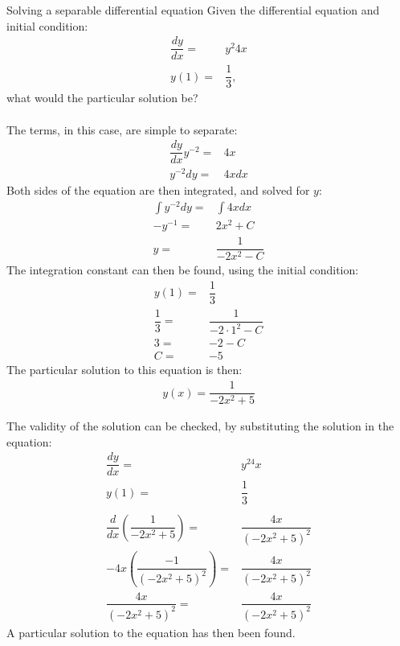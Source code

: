 \begin{example}{Solving a separable differential equation}{}
Given the differential equation and initial condition:
\begin{align*}
	\dfrac{dy}{dx} =& y^2 4x \\
	y(1) =& \dfrac{1}{3},
\end{align*}
what would the particular solution be?
\\ \\
The terms, in this case, are simple to separate: 
\begin{align*}
	\dfrac{dy}{dx} y^{-2} =& 4x \\
	y^{-2} dy =& 4x dx 
\end{align*}
Both sides of the equation are then integrated, and solved for $y$:
\begin{align*}
	\int{y^{-2} dy} =& \int{4x dx} \\
	-y^{-1} =& 2x^2 +C \\
	y =& \dfrac{1}{-2x^2-C}
\end{align*}
The integration constant can then be found, using the initial condition:
\begin{align*}
	y(1) =& \dfrac{1}{3} \\
	\dfrac{1}{3} =& \dfrac{1}{-2 \cdot 1^2-C} \\
	3 =& -2-C \\
	C =& -5
\end{align*}
The particular solution to this equation is then:
\begin{align*}
	y(x) = \dfrac{1}{-2x^2+5}
\end{align*}

The validity of the solution can be checked, by substituting the solution in the equation:
\begin{align*}
	\dfrac{dy}{dx} =& y^24x \\
	y(1) =& \dfrac{1}{3}  \\
	\\
	\dfrac{d}{dx} \left(\dfrac{1}{-2x^2+5}\right) =& \dfrac{4x}{(-2x^2+5)^2} \\
	-4x\left(\dfrac{-1}{(-2x^2+5)^2}\right)  =& \dfrac{4x}{(-2x^2+5)^2} \\
	\dfrac{4x}{(-2x^2+5)^2} =& \dfrac{4x}{(-2x^2+5)^2}
\end{align*}
A particular solution to the equation has then been found.
\end{example}
